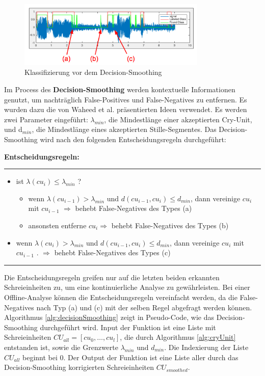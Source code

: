 \begin{figure}[h]
	\centering
	\includegraphics[width=0.8\textwidth]{bilder/smoothing02.png}
	\caption[Klassifizierung vor dem Decision-Smoothing]{Klassifizierung vor dem Decision-Smoothing}
	\label{img:beforeSmoothing}
\end{figure}

Im Process des \textbf{Decision-Smoothing} werden kontextuelle Informationen genutzt, um nachträglich False-Positives und False-Negatives zu entfernen. Es wurden dazu die von Waheed et al. \cite{vad_entropy} präsentierten Ideen verwendet. Es werden zwei Parameter eingeführt: $\lambda_{min}$, die Mindestlänge einer akzeptierten Cry-Unit, und d$_{min}$, die Mindestlänge eines akzeptierten Stille-Segmentes. Das Decision-Smoothing wird nach den folgenden Entscheidungsregeln durchgeführt:

\textbf{Entscheidungsregeln: }\noindent\rule{0.7\linewidth}{0.3pt}
\begin{itemize}
	\item ist $\lambda (cu_{i}) \leq \lambda_{min}$ ?
	\begin{itemize}
		\item wenn $\lambda (cu_{i-1}) > \lambda_{min}$ und $d (cu_{i-1}, cu_{i}) \leq d_{min}$, dann vereinige $cu_{i}$ mit $cu_{i-1}$ $\Longrightarrow$ behebt False-Negatives des Types (a)
		\item ansonsten entferne $cu_i \Longrightarrow$ behebt False-Negatives des Types (b)
	\end{itemize}
	\item wenn $\lambda (cu_{i}) > \lambda_{min}$ und $d (cu_{i-1}, cu_{i}) \leq d_{min}$, dann vereinige $cu_{i}$ mit $cu_{i-1}$ . $\Rightarrow$ behebt False-Negatives des Types (c)
\end{itemize}
\noindent\rule{\linewidth}{0.3pt}

Die Entscheidungsregeln greifen nur auf die letzten beiden erkannten Schreieinheiten zu, um eine kontinuierliche Analyse zu gewährleisten. Bei einer Offline-Analyse können die Entscheidungsregeln vereinfacht werden, da die False-Negatives nach Typ (a) und (c) mit der selben Regel abgefragt werden können. Algorithmus \autoref{alg:decisionSmoothing} zeigt in Pseudo-Code, wie das Decision-Smoothing durchgeführt wird. Input der Funktion ist eine Liste mit Schreieinheiten $CU_{all} = [cu_0 , \ldots , cu_l]$, die durch Algorithmus \ref{alg:cryUnit} entstanden ist, sowie die Grenzwerte $\lambda_{min}$ und $d_{min}$. Die Indexierung der Liste $CU_{all}$ beginnt bei 0. Der Output der Funktion ist eine Liste aller durch das Decision-Smoothing korrigierten Schreieinheiten $CU_{smoothed}$.

